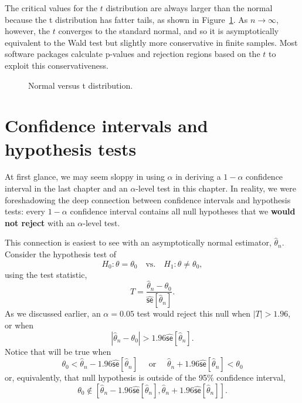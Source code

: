 \documentclass[
  13pt,
  letterpaper,
  DIV=11,
  numbers=noendperiod]{scrreprt}
\newcommand{\se}{\textsf{se}}
\theoremstyle{definition}
\theoremstyle{definition}
\theoremstyle{plain}
\theoremstyle{remark}
\begin{document}
The critical values for the \(t\) distribution are always larger than
the normal because the t distribution has fatter tails, as shown in
Figure~\ref{fig-shape-of-t}. As \(n\to\infty\), however, the \(t\)
converges to the standard normal, and so it is asymptotically equivalent
to the Wald test but slightly more conservative in finite samples. Most
software packages calculate p-values and rejection regions based on the
\(t\) to exploit this conservativeness.

\begin{figure}[th]


\caption{\label{fig-shape-of-t}Normal versus t distribution.}

\end{figure}%

\section{Confidence intervals and hypothesis
tests}\label{confidence-intervals-and-hypothesis-tests}

At first glance, we may seem sloppy in using \(\alpha\) in deriving a
\(1 - \alpha\) confidence interval in the last chapter and an
\(\alpha\)-level test in this chapter. In reality, we were foreshadowing
the deep connection between confidence intervals and hypothesis tests:
every \(1-\alpha\) confidence interval contains all null hypotheses that
we \textbf{would not reject} with an \(\alpha\)-level test.

This connection is easiest to see with an asymptotically normal
estimator, \(\widehat{\theta}_n\). Consider the hypothesis test of \[ 
H_0: \theta = \theta_0 \quad \text{vs.}\quad H_1: \theta \neq \theta_0,
\] using the test statistic, \[ 
T = \frac{\widehat{\theta}_{n} - \theta_{0}}{\widehat{\se}[\widehat{\theta}_{n}]}. 
\] As we discussed earlier, an \(\alpha = 0.05\) test would reject this
null when \(|T| > 1.96\), or when \[ 
|\widehat{\theta}_{n} - \theta_{0}| > 1.96 \widehat{\se}[\widehat{\theta}_{n}]. 
\] Notice that will be true when \[ 
\theta_{0} < \widehat{\theta}_{n} - 1.96\widehat{\se}[\widehat{\theta}_{n}]\quad \text{ or }\quad \widehat{\theta}_{n} + 1.96\widehat{\se}[\widehat{\theta}_{n}] < \theta_{0}
\] or, equivalently, that null hypothesis is outside of the 95\%
confidence interval,
\[\theta_0 \notin \left[\widehat{\theta}_{n} - 1.96\widehat{\se}[\widehat{\theta}_{n}], \widehat{\theta}_{n} + 1.96\widehat{\se}[\widehat{\theta}_{n}]\right].\]
\end{document}

